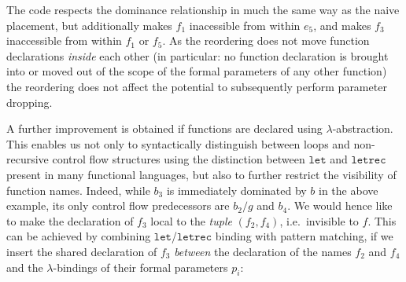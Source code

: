 The code respects the dominance relationship in much the same way as
the naive placement, but additionally makes $f_1$ inacessible
from within $e_5$, and makes $f_3$ inaccessible from within $f_1$ or
$f_5$. As the reordering does not move function declarations
\emph{inside} each other (in particular: no function declaration is
brought into or moved out of the scope of the formal parameters of any
other function) the reordering does not affect the potential to
subsequently perform parameter dropping.

A further improvement is obtained if functions are declared using
$\lambda$-abstraction. This enables us not only to syntactically
distinguish between loops and non-recursive control flow structures
using the distinction between $\mathtt{let}$ and $\mathtt{letrec}$
present in many functional languages, but also to further restrict the
visibility of function names. Indeed, while $b_3$ is immediately
dominated by $b$ in the above example, its only control flow
predecessors are $b_2/g$ and $b_4$. We would hence like to make the
declaration of $f_3$ local to the \emph{tuple} $(f_2, f_4)$,
i.e.~invisible to $f$.  This can be achieved by combining
$\mathtt{let}$/$\mathtt{letrec}$ binding with pattern matching, if we
insert the shared declaration of $f_3$
\emph{between} the declaration of the names $f_2$ and $f_4$ and the
$\lambda$-bindings of their formal parameters $p_i$:
